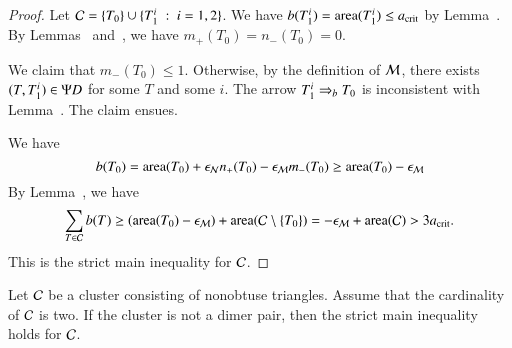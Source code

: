 \begin{proof}  
  Let $\mathcal C = \{T_0\}\cup \{T_1^i \ :\  i=1,2\}$.  We have $b(T_1^i) =
  {\operatorname{area}}(T_1^i)\le a_\text{crit}$ by Lemma~.  By
  Lemmas~ and~, we have
  $m_+(T_0)=n_-(T_0)=0$.

  We claim that $m_-(T_0)\le 1$.  Otherwise, by the definition of
  $\mathcal M$, there exists $(T,T_1^i)\in\Psi D$ for some $T$ and some $i$.  The
  arrow $T_1^i\Rightarrow_{b} T_0$ is inconsistent with Lemma~.
  The claim ensues.

We have
\[
b(T_0) = {\operatorname{area}}(T_0) + \epsilon_{\mathcal N} n_+(T_0) - \epsilon_{\mathcal M} m_-(T_0) 
\ge {\operatorname{area}}(T_0) - \epsilon_{\mathcal M}
\]
By Lemma~, we have
\[
\sum_{T\in\mathcal C} b(T) \ge ({\operatorname{area}}(T_0) - \epsilon_{\mathcal M}) +  {\operatorname{area}}(\mathcal C\setminus \{T_0\}) 
= -\epsilon_{\mathcal M}+ {\operatorname{area}}(\mathcal C) > 3a_\text{crit}.
\]
This is the strict main inequality for $\mathcal C$.
\end{proof}

\begin{lemma} 
  Let $\mathcal C$ be a cluster consisting of nonobtuse triangles.  Assume
  that the cardinality of $\mathcal C$ is two.  If the cluster is not a dimer
  pair, then the strict main inequality holds for $\mathcal C$.
\end{lemma}

